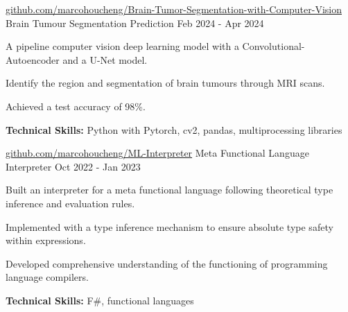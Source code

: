 

\begin{cventries}

  \cventry
    {\href{https://github.com/marcohoucheng/Brain-Tumor-Segmentation-with-Computer-Vision}{github.com/marcohoucheng/Brain-Tumor-Segmentation-with-Computer-Vision}} %
    {Brain Tumour Segmentation Prediction} %
    {} %
    {Feb 2024 - Apr 2024} %
    {
        \begin{cvitems} %
            \item {A pipeline computer vision deep learning model with a Convolutional-Autoencoder and a U-Net model.}
            \item {Identify the region and segmentation of brain tumours through MRI scans.}
            \item {Achieved a test accuracy of 98\%.}
            \item {\textbf{Technical Skills:} Python with Pytorch, cv2, pandas, multiprocessing libraries}
        \end{cvitems}
    }

  \cventry
    {\href{https://github.com/marcohoucheng/ML-Interpreter}{github.com/marcohoucheng/ML-Interpreter}} %
    {Meta Functional Language Interpreter} %
    {} %
    {Oct 2022 - Jan 2023} %
    {
        \begin{cvitems} %
            \item {Built an interpreter for a meta functional language following theoretical type inference and evaluation rules.}
            \item {Implemented with a type inference mechanism to ensure absolute type safety within expressions.}
            \item {Developed comprehensive understanding of the functioning of programming language compilers.}
            \item {\textbf{Technical Skills:} F\#, functional languages}
        \end{cvitems}
    }


\end{cventries}

